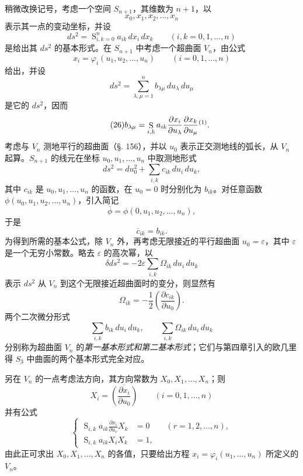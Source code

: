 稍微改换记号，考虑一个空间 \(S_{n+1}\)，其维数为 \(n+1\)，以
\[
 x_0,x_1,x_2,
\ldots,x_n
\]
表示其一点的变动坐标，并设
\begin{equation}\tag{24}
 ds^2=\mathop{\mathrm{S}}_{i,k=0}^{n}a_{ik}\,dx_i\,dx_k
 \qquad(i,k=0,1,
\ldots,n)
\end{equation}
是给出其 \(ds^2\) 的基本形式。在 \(S_{n+1}\) 中考虑一个超曲面 \(V_n\)，由公式
\[
 x_i=\varphi_i(u_1,u_2,
\ldots,u_n)\qquad(i=0,1,
\ldots,n)
\]
给出，并设
\begin{equation}\tag{25}
 ds^2=\sum_{\lambda,\mu=1}^{n}b_{\lambda\mu}\,du_\lambda\,du_\mu
\end{equation}
是它的 \(ds^2\)，因而
\begin{equation}\tag{26}
 b_{\lambda\mu}=\mathop{\mathrm{S}}_{i,k}a_{ik}\frac{\partial x_i}{\partial u_\lambda}\frac{\partial x_k}{\partial u_\mu}\srcfnmark{1}.
\end{equation}
考虑与 \(V_n\) 测地平行的超曲面（\S. 156），并以 \(u_0\) 表示正交测地线的弧长，从 \(V_n\) 起算。\(S_{n+1}\) 的线元在坐标 \(u_0,u_1,\ldots,u_n\) 中取测地形式
\begin{equation}\tag{27}
 ds^2=du_0^2+\sum_{i,k}c_{ik}\,du_i\,du_k,
\end{equation}
其中 \(c_{ik}\) 是 \(u_0,u_1,\ldots,u_n\) 的函数，在 \(u_0=0\) 时分别化为 \(b_{ik}\)。对任意函数 \(\phi(u_0,u_1,u_2,\ldots,u_n)\)，引入简记
\[
 \overline{\phi}=\phi(0,u_1,u_2,
\ldots,u_n),
\]
于是
\[
 \overline{c}_{ik}=b_{ik}.
\]
为得到所需的基本公式，除 \(V_n\) 外，再考虑无限接近的平行超曲面 \(u_0=\varepsilon\)，其中 \(\varepsilon\) 是一个无穷小常数。略去 \(\varepsilon\) 的高次幂，以
\begin{equation}\tag{28}
 \delta ds^2=-2\varepsilon\sum_{i,k}\Omega_{ik}\,du_i\,du_k
\end{equation}
表示 \(ds^2\) 从 \(V_n\) 到这个无限接近超曲面时的变分，则显然有
\begin{equation}\tag{29}
 \Omega_{ik}=-\frac12\overline{\left(\frac{\partial c_{ik}}{\partial u_0}\right)}.
\end{equation}
两个二次微分形式
\[
 \sum_{i,k}b_{ik}\,du_i\,du_k,
 \qquad
 \sum_{i,k}\Omega_{ik}\,du_i\,du_k
\]
分别称为超曲面 \(V_n\) 的\emph{第一基本形式和第二基本形式}；它们与第四章引入的欧几里得 \(S_3\) 中曲面的两个基本形式完全对应。

另在 \(V_n\) 的一点考虑法方向，其方向常数为 \(X_0,X_1,\ldots,X_n\)；则
\[
 X_i=\overline{\left(\frac{\partial x_i}{\partial u_0}\right)}
 \qquad(i=0,1,
\ldots,n)
\]
并有公式
\begin{equation}\tag{30}
\left\{
\begin{aligned}
\mathop{\mathrm{S}}_{i,k}a_{ik}\frac{\partial x_i}{\partial u_r}X_k&=0\qquad(r=1,2,
\ldots,n),\\
\mathop{\mathrm{S}}_{i,k}a_{ik}X_iX_k&=1,
\end{aligned}
\right.
\end{equation}
由此正可求出 \(X_0,X_1,\ldots,X_n\) 的各值，只要给出方程 \(x_i=\varphi_i(u_1,\ldots,u_n)\) 所定义的 \(V_n\)。

